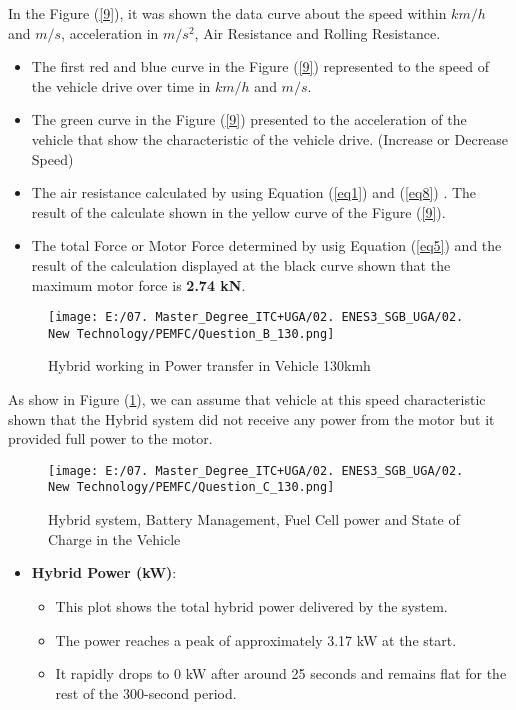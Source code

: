 \documentclass[12pt,a4paper]{article}
\numberwithin{equation}{section}
\begin{document}
{	In the Figure (\ref{9}), it was shown the data curve about the speed within $km/h$ and $m/s$, acceleration in $m/s^2$, Air Resistance and Rolling Resistance.

\begin{itemize}
	\item The first red and blue curve in the Figure (\ref{9}) represented to the speed of the vehicle drive over time in $km/h$ and $m/s$.
	\item The green curve in the Figure (\ref{9}) presented to the acceleration of the vehicle that show the characteristic of the vehicle drive. (Increase or Decrease Speed)
	\item The air resistance calculated by using Equation (\ref{eq1})  and (\ref{eq8}) . The result of the calculate shown in the yellow curve of the Figure (\ref{9}).
	\item The total Force or Motor Force determined by usig Equation (\ref{eq5}) and the result of the calculation displayed at the black curve shown that the maximum motor force is \textbf{2.74 kN}.
\end{itemize}


\begin{figure}[h]
	\centering 
	\texttt{[image: E:/07. Master\_Degree\_ITC+UGA/02. ENES3\_SGB\_UGA/02. New Technology/PEMFC/Question\_B\_130.png]}
	\caption{\small {Hybrid working in Power transfer in Vehicle 130kmh}}
	\label{10}
\end{figure}
As show in Figure (\ref{10}), we can assume that vehicle at this speed characteristic shown that the Hybrid system did not receive any power from the motor but it provided full power to the motor.


\begin{figure}[h]
	\centering 
	\texttt{[image: E:/07. Master\_Degree\_ITC+UGA/02. ENES3\_SGB\_UGA/02. New Technology/PEMFC/Question\_C\_130.png]}
	\caption{\small {Hybrid system, Battery Management, Fuel Cell power and State of Charge in the Vehicle}}
	\label{11}
\end{figure}
\begin{itemize}
	\item \textbf{Hybrid Power (kW)}:
	\begin{itemize}
		\item This plot shows the total hybrid power delivered by the system.
		\item The power reaches a peak of approximately 3.17 kW at the start.
		\item It rapidly drops to 0 kW after around 25 seconds and remains flat for the rest of the 300-second period.
	\end{itemize}
	

\end{itemize}}
\end{document}
